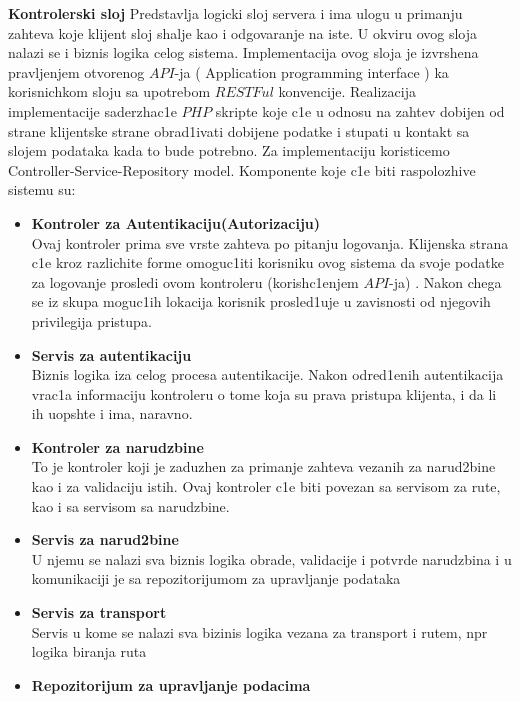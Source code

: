 \begin{enumarate}
	\item {\textbf{Kontrolerski sloj}
			Predstavlja logicki sloj servera i ima ulogu u primanju zahteva koje klijent sloj shalje kao i odgovaranje na iste. U okviru ovog sloja nalazi se i biznis logika celog sistema.  Implementacija ovog sloja je izvrshena pravljenjem otvorenog $API$-ja ( \selectfont Application programming interface  \selectfont ) ka korisnichkom sloju sa upotrebom $RESTFul$ konvencije. Realizacija implementacije saderzhac1e $PHP$ skripte koje c1e u odnosu na zahtev dobijen od strane klijentske strane obrad1ivati dobijene podatke i stupati u kontakt sa slojem podataka kada to bude potrebno. Za implementaciju koristicemo  \selectfont Controller-Service-Repository \selectfont  model.  Komponente koje c1e biti raspolozhive sistemu su:
			\begin{itemize}
				\item {\textbf{Kontroler za Autentikaciju(Autorizaciju)} \\
						Ovaj kontroler prima sve vrste zahteva po pitanju logovanja. Klijenska strana c1e kroz razlichite forme omoguc1iti korisniku ovog sistema da svoje podatke za logovanje prosledi ovom kontroleru (korish\-c1enjem $API$-ja) . Nakon chega se iz skupa moguc1ih lokacija korisnik prosled1uje u zavisnosti od njegovih privilegija pristupa.}
				\item{\textbf{Servis za autentikaciju}\\
				Biznis logika iza celog procesa autentikacije. Nakon odred1enih autentikacija vrac1a informaciju kontroleru o tome koja su prava pristupa klijenta, i da li ih uopshte i ima, naravno.}
				\item{\textbf{Kontroler za narudzbine}\\
					To je kontroler koji je zaduzhen za primanje zahteva vezanih za narud2bine kao i za validaciju istih.  Ovaj kontroler c1e biti povezan sa servisom za rute, kao i sa servisom sa narudzbine. }
				\item{\textbf{Servis za narud2bine} \\
					U njemu se nalazi sva biznis logika obrade, validacije i potvrde narudzbina i u komunikaciji je sa repozitorijumom za upravljanje podataka}
				\item{\textbf{Servis za transport} \\
					Servis u kome se nalazi sva bizinis logika vezana za transport i rutem, npr logika biranja ruta}
				\item{\textbf{Repozitorijum za upravljanje podacima}
}
\end{itemize}}
\end{enumarate}
